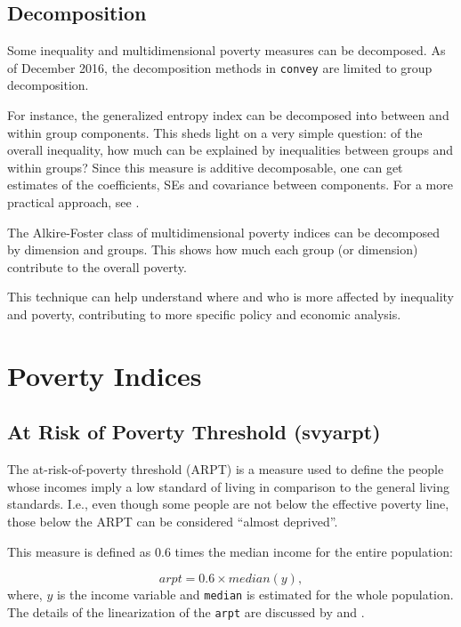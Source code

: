 \documentclass[]{book}
\begin{document}
\section{Decomposition}\label{decomposition}

Some inequality and multidimensional poverty measures can be decomposed.
As of December 2016, the decomposition methods in \texttt{convey} are
limited to group decomposition.

For instance, the generalized entropy index can be decomposed into
between and within group components. This sheds light on a very simple
question: of the overall inequality, how much can be explained by
inequalities between groups and within groups? Since this measure is
additive decomposable, one can get estimates of the coefficients, SEs
and covariance between components. For a more practical approach, see
\citep{lima2013}.

The Alkire-Foster class of multidimensional poverty indices can be
decomposed by dimension and groups. This shows how much each group (or
dimension) contribute to the overall poverty.

This technique can help understand where and who is more affected by
inequality and poverty, contributing to more specific policy and
economic analysis.

\chapter{Poverty Indices}\label{poverty}

\section{At Risk of Poverty Threshold
(svyarpt)}\label{at-risk-of-poverty-threshold-svyarpt}

The at-risk-of-poverty threshold (ARPT) is a measure used to define the
people whose incomes imply a low standard of living in comparison to the
general living standards. I.e., even though some people are not below
the effective poverty line, those below the ARPT can be considered
``almost deprived''.

This measure is defined as \(0.6\) times the median income for the
entire population:

\[
arpt = 0.6 \times median(y),
\] where, \(y\) is the income variable and \texttt{median} is estimated
for the whole population. The details of the linearization of the
\texttt{arpt} are discussed by \citet{deville1999} and
\citet{osier2009}.
\end{document}
